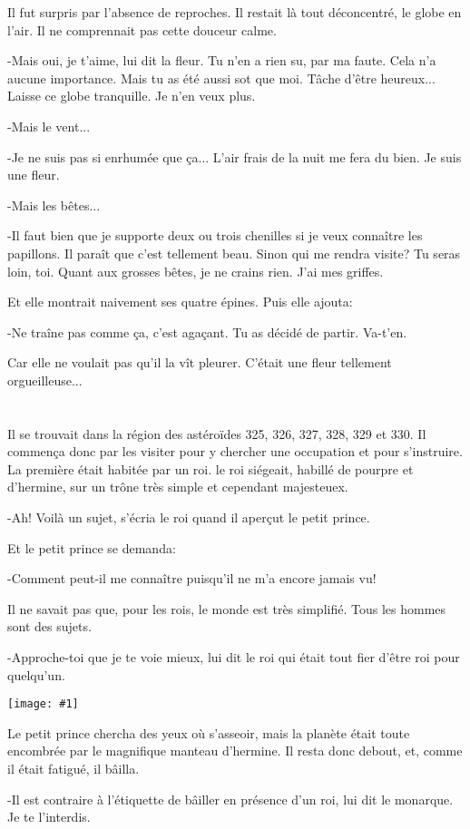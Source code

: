 \documentclass{report}
\newcommand{\parachapter}[2][]{\end{paracol}\chapter[#1]{#2}\begin{paracol}{2}}
\newcommand{\incpic}[1]{%
\end{paracol}
\begin{center}
    \texttt{[image: \#1]}
\end{center}
\begin{paracol}{2}}
\begin{document}
\begin{paracol}{2}
Il fut surpris par l'absence de reproches. Il restait là tout déconcentré, le globe en l'air. Il ne comprennait pas cette douceur calme.

-Mais oui, je t'aime, lui dit la fleur. Tu n'en a rien su, par ma faute. Cela n'a aucune importance. Mais tu as été aussi sot que moi. Tâche d'être heureux... Laisse ce globe tranquille. Je n'en veux plus.

-Mais le vent...

-Je ne suis pas si enrhumée que ça... L'air frais de la nuit me fera du bien. Je suis une fleur.

-Mais les bêtes...

-Il faut bien que je supporte deux ou trois chenilles si je veux connaître les papillons. Il paraît que c'est tellement beau. Sinon qui me rendra visite? Tu seras loin, toi. Quant aux grosses bêtes, je ne crains rien. J'ai mes griffes.

Et elle montrait naivement ses quatre épines. Puis elle ajouta:

-Ne traîne pas comme ça, c'est agaçant. Tu as décidé de partir. Va-t'en.

Car elle ne voulait pas qu'il la vît pleurer. C'était une fleur tellement orgueilleuse...

\parachapter{} %
Il se trouvait dans la région des astéroïdes 325, 326, 327, 328, 329 et 330. Il commença donc par les visiter pour y chercher une occupation et pour s'instruire.
La première était habitée par un roi. le roi siégeait, habillé de pourpre et d'hermine, sur un trône très simple et cependant majesteuex.

-Ah! Voilà un sujet, s'écria le roi quand il aperçut le petit prince.

Et le petit prince se demanda:

-Comment peut-il me connaître puisqu'il ne m'a encore jamais vu!

Il ne savait pas que, pour les rois, le monde est très simplifié. Tous les hommes sont des sujets.

-Approche-toi que je te voie mieux, lui dit le roi qui était tout fier d'être roi pour quelqu'un.

\incpic{pic/image25.jpeg}

Le petit prince chercha des yeux où s'asseoir, mais la planète était toute encombrée par le magnifique manteau d'hermine. Il resta donc debout, et, comme il était fatigué, il bâilla.

-Il est contraire à l'étiquette de bâiller en présence d'un roi, lui dit le monarque. Je te l'interdis.


\end{paracol}
\end{document}
